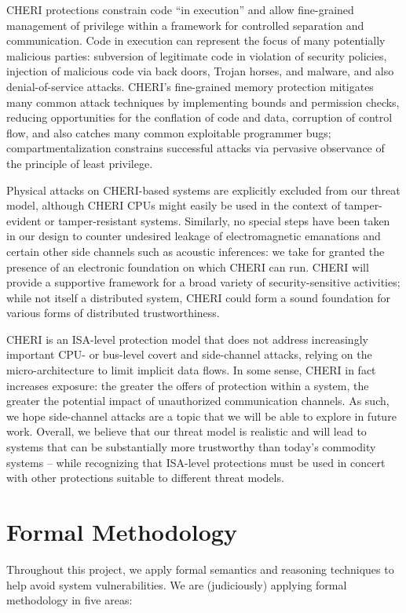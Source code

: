 CHERI protections constrain code ``in execution'' and allow fine-grained management
of privilege within a framework for controlled separation and communication.
Code in execution can represent the focus of many potentially malicious parties:
subversion of legitimate code in violation of security policies, injection of malicious
code via back doors, Trojan horses, and malware, and also 
denial-of-service attacks.
CHERI's fine-grained memory protection mitigates 
many common attack techniques by implementing bounds and permission checks,
reducing opportunities for the conflation of code and data, corruption of
control flow, and also catches many common exploitable programmer bugs;
compartmentalization constrains successful attacks via pervasive observance of
the principle of least privilege.

Physical attacks on CHERI-based systems are explicitly excluded from our threat model,
although CHERI CPUs might easily be used in the context of tamper-evident or
tamper-resistant systems.
Similarly, no special steps have been taken in our design to counter undesired
leakage of electromagnetic emanations and certain other side channels such as acoustic inferences: 
we take for granted the presence of an
electronic foundation on which CHERI can run.
CHERI will provide a supportive framework for a broad variety of security-sensitive
activities; while not itself a distributed system, CHERI could form a sound foundation for various forms of distributed trustworthiness.

CHERI is an ISA-level protection model that does not address increasingly
important CPU- or bus-level covert and side-channel attacks, relying on the
micro-architecture to limit implicit data flows.
In some sense, CHERI in fact increases exposure: the greater the offers of
protection within a system, the greater the potential impact of unauthorized
communication channels.
As such, we hope side-channel attacks are a topic that we will be able to
explore in future work.  
Overall, we believe that our threat model is realistic and will
lead to systems that can be substantially more trustworthy than
today's commodity systems -- while recognizing that ISA-level protections must
be used in concert with other protections suitable to different threat models.

\section{Formal Methodology}

Throughout this project, we apply formal semantics and reasoning techniques to help avoid
system vulnerabilities.
We are (judiciously) applying formal methodology in
five areas:

